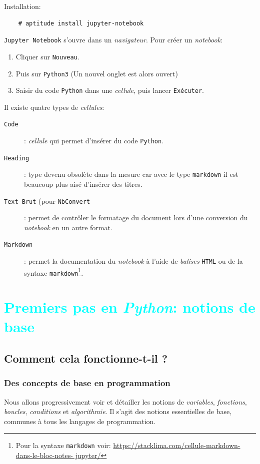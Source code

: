 \documentclass[a4paper,11pt]{book}
\begin{document}
Installation:
\begin{verbatim}
    # aptitude install jupyter-notebook
\end{verbatim}
\medskip

\texttt{Jupyter Notebook} s'ouvre dans un \textit{navigateur}. Pour créer un \textit{notebook}:
\begin{enumerate}
	\item Cliquer sur \texttt{Nouveau}.
	\item Puis sur \texttt{Python3} (Un nouvel onglet est alors ouvert)
	\item Saisir du code \texttt{Python} dans une \textit{cellule}, puis lancer \texttt{Exécuter}.
\end{enumerate}
\medskip

Il existe quatre types de \textit{cellules}: 
\begin{description}
	\item[\texttt{Code}]: \textit{cellule} qui permet d'insérer du code \texttt{Python}.
	\item[\texttt{Heading}]: type devenu obsolète dans la mesure car avec le type \texttt{markdown} il est beaucoup plus aisé d'insérer des titres.
	\item[\texttt{Text Brut} (pour \texttt{NbConvert}]: permet de contrôler le formatage du document lors d'une conversion du \textit{notebook} en un autre format.
	\item[\texttt{Markdown}]: permet la documentation du \textit{notebook} à l'aide de \textit{balises} \texttt{HTML} ou de la syntaxe \texttt{markdown}\footnote{Pour la syntaxe \texttt{markdown} voir: \url{https://stacklima.com/cellule-markdown-dans-le-bloc-notes- jupyter/}}.
\end{description}
\medskip

\part{\textcolor{cyan}{Premiers pas en \textit{Python}: notions de base}}

\chapter{Comment cela fonctionne-t-il ?}
\section{Des concepts de base en programmation}
Nous allons progressivement voir et détailler les notions de \textit{variables}, \textit{fonctions}, \textit{boucles}, \textit{conditions} et \textit{algorithmie}. Il s'agit des notions essentielles de base, communes à tous les langages de programmation.
\medskip
\end{document}
